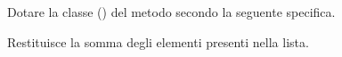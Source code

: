Dotare la classe  () del metodo  secondo la seguente specifica.

\begin{methodslist}

 {
Restituisce la somma degli elementi presenti nella lista.
}

\end{methodslist}